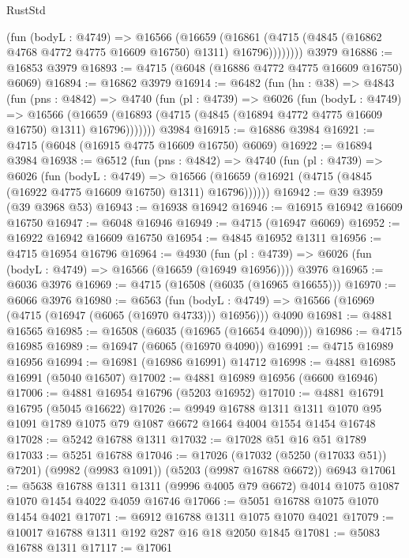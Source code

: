 \begin{lexlean}{RustStd}
\begin{coremodule}
            (fun (bodyL : @4749) =>
            @16566
              (@16659
                (@16861 (@4715 (@4845 (@16862 @4768 @4772 @4775 @16609 @16750) @1311) @16796))))))))
    @3979
@16886 := @16853 @3979
@16893 := @4715 (@6048 (@16886 @4772 @4775 @16609 @16750) @6069)
@16894 := @16862 @3979
@16914 := @6482
    (fun (hn : @38) =>
    @4843
      (fun (pns : @4842) =>
      @4740
        (fun (pl : @4739) =>
        @6026
          (fun (bodyL : @4749) =>
          @16566
            (@16659 (@16893 (@4715 (@4845 (@16894 @4772 @4775 @16609 @16750) @1311) @16796)))))))
    @3984
@16915 := @16886 @3984
@16921 := @4715 (@6048 (@16915 @4775 @16609 @16750) @6069)
@16922 := @16894 @3984
@16938 := @6512
    (fun (pns : @4842) =>
    @4740
      (fun (pl : @4739) =>
      @6026
        (fun (bodyL : @4749) =>
        @16566 (@16659 (@16921 (@4715 (@4845 (@16922 @4775 @16609 @16750) @1311) @16796))))))
@16942 := @39 @3959 (@39 @3968 @53)
@16943 := @16938 @16942
@16946 := @16915 @16942 @16609 @16750
@16947 := @6048 @16946
@16949 := @4715 (@16947 @6069)
@16952 := @16922 @16942 @16609 @16750
@16954 := @4845 @16952 @1311
@16956 := @4715 @16954 @16796
@16964 := @4930
    (fun (pl : @4739) => @6026 (fun (bodyL : @4749) => @16566 (@16659 (@16949 @16956))))
    @3976
@16965 := @6036 @3976
@16969 := @4715 (@16508 (@6035 (@16965 @16655)))
@16970 := @6066 @3976
@16980 := @6563
    (fun (bodyL : @4749) => @16566 (@16969 (@4715 (@16947 (@6065 (@16970 @4733))) @16956)))
    @4090
@16981 := @4881 @16565
@16985 := @16508 (@6035 (@16965 (@16654 @4090)))
@16986 := @4715 @16985
@16989 := @16947 (@6065 (@16970 @4090))
@16991 := @4715 @16989 @16956
@16994 := @16981 (@16986 @16991) @14712
@16998 := @4881 @16985 @16991 (@5040 @16507)
@17002 := @4881 @16989 @16956 (@6600 @16946)
@17006 := @4881 @16954 @16796 (@5203 @16952)
@17010 := @4881 @16791 @16795 (@5045 @16622)
@17026 := @9949
    @16788
    @1311
    @1311
    @1070
    @95
    @1091
    @1789
    @1075
    @79
    @1087
    @6672
    @1664
    @4004
    @1554
    @1454
    @16748
@17028 := @5242 @16788 @1311
@17032 := @17028 @51 @16 @51 @1789
@17033 := @5251 @16788
@17046 := @17026
    (@17032 (@5250 (@17033 @51)) @7201)
    (@9982 (@9983 @1091))
    (@5203 (@9987 @16788 @6672))
    @6943
@17061 := @5638
    @16788
    @1311
    @1311
    (@9996 @4005 @79 @6672)
    @4014
    @1075
    @1087
    @1070
    @1454
    @4022
    @4059
    @16746
@17066 := @5051 @16788 @1075 @1070 @1454 @4021
@17071 := @6912 @16788 @1311 @1075 @1070 @4021
@17079 := @10017 @16788 @1311 @192 @287 @16 @18 @2050 @1845
@17081 := @5083 @16788 @1311
@17117 := @17061

\end{coremodule}
\end{lexlean}
